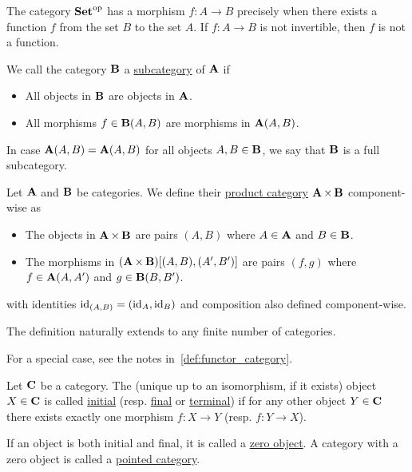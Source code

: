 \begin{example}
  The category $\operatorname{\mathbf{Set}}^{\operatorname{op}}$ has a morphism $f: A \to B$ precisely when there exists a function $f$ from the set $B$ to the set $A$. If $f: A \to B$ is not invertible, then $f$ is not a function.
\end{example}

\begin{definition}\label{def:subcategory}\cite[definition 1.2.18]{Leinster2014}
  We call the category $\operatorname{\mathbf{B}}$ a \uline{subcategory} of $\operatorname{\mathbf{A}}$ if
  \begin{itemize}
    \item All objects in $\operatorname{\mathbf{B}}$ are objects in $\operatorname{\mathbf{A}}$.
    \item All morphisms $f \in \operatorname{\mathbf{B}}(A, B)$ are morphisms in $\operatorname{\mathbf{A}}(A, B)$.
  \end{itemize}

  In case $\operatorname{\mathbf{A}}(A, B) = \operatorname{\mathbf{A}}(A, B)$ for all objects $A, B \in \operatorname{\mathbf{B}}$, we say that $\operatorname{\mathbf{B}}$ is a full subcategory.
\end{definition}

\begin{definition}\label{def:product_category}\cite[exercise 1.1.14]{Leinster2014}
  Let $\operatorname{\mathbf{A}}$ and $\operatorname{\mathbf{B}}$ be categories. We define their \uline{product category} $\operatorname{\mathbf{A}} \times \operatorname{\mathbf{B}}$ component-wise as
  \begin{itemize}
    \item The objects in $\operatorname{\mathbf{A}} \times \operatorname{\mathbf{B}}$ are pairs $(A, B)$ where $A \in \operatorname{\mathbf{A}}$ and $B \in \operatorname{\mathbf{B}}$.
    \item The morphisms in $(\operatorname{\mathbf{A}} \times \operatorname{\mathbf{B}})[(A, B), (A', B')]$ are pairs $(f, g)$ where $f \in \operatorname{\mathbf{A}}(A, A')$ and $g \in \operatorname{\mathbf{B}}(B, B')$.
  \end{itemize}
  with identities $\operatorname{id}_{(A,B)} =(\operatorname{id}_A, \operatorname{id}_B)$ and composition also defined component-wise.

  The definition naturally extends to any finite number of categories.

  For a special case, see the notes in~\cref{def:functor_category}.
\end{definition}

\begin{definition}\label{def:initial_final_objects}\cite[definitions 2.1.7]{Leinster2014}
  Let $\operatorname{\mathbf{C}}$ be a category. The (unique up to an isomorphism, if it exists) object $X \in \operatorname{\mathbf{C}}$ is called \uline{initial} (resp. \uline{final} or \uline{terminal}) if for any other object $Y \in \operatorname{\mathbf{C}}$ there exists exactly one morphism $f: X \to Y$ (resp. $f: Y \to X$).

  If an object is both initial and final, it is called a \uline{zero object}. A category with a zero object is called a \uline{pointed category}.
\end{definition}

